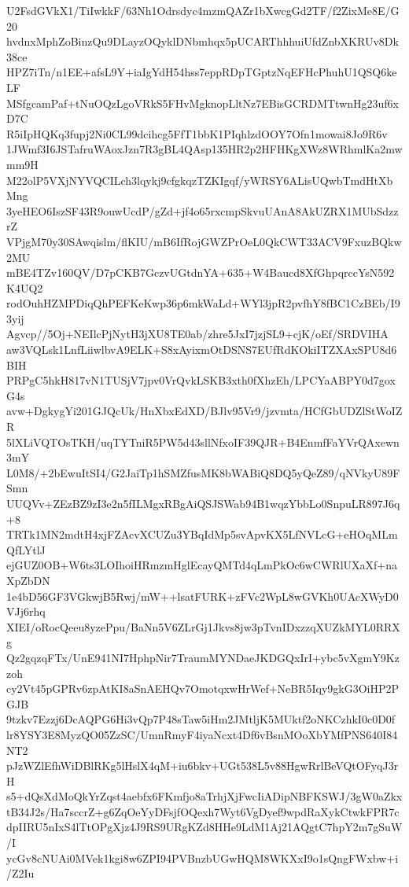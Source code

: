 U2FsdGVkX1/TiIwkkF/63Nh1Odrsdyc4mzmQAZr1bXwcgGd2TF/f2ZixMe8E/G20
hvdnxMphZoBinzQu9DLayzOQyklDNbmhqx5pUCARThhhuiUfdZnbXKRUv8Dk38ce
HPZ7iTn/n1EE+afsL9Y+iaIgYdH54hss7eppRDpTGptzNqEFHcPhuhU1QSQ6keLF
MSfgcamPaf+tNuOQzLgoVRkS5FHvMgknopLltNz7EBisGCRDMTtwnHg23uf6xD7C
R5iIpHQKq3fupj2Ni0CL99dcihcg5FfT1bbK1PIqhlzdOOY7Ofn1mowai8Jo9R6v
1JWmf3I6JSTafruWAoxJzn7R3gBL4QAsp135HR2p2HFHKgXWz8WRhmlKa2mwmm9H
M22olP5VXjNYVQCILch3lqykj9cfgkqzTZKIgqf/yWRSY6ALisUQwbTmdHtXbMng
3yeHEO6IszSF43R9ouwUcdP/gZd+jf4o65rxcmpSkvuUAnA8AkUZRX1MUbSdzzrZ
VPjgM70y30SAwqislm/flKIU/mB6IfRojGWZPrOeL0QkCWT33ACV9FxuzBQkw2MU
mBE4TZv160QV/D7pCKB7GczvUGtdnYA+635+W4Baucd8XfGhpqrccYsN592K4UQ2
rodOuhHZMPDiqQhPEFKeKwp36p6mkWaLd+WYl3jpR2pvfhY8fBC1CzBEb/I93yij
Agvcp//5Oj+NEIlcPjNytH3jXU8TE0ab/zhre5JxI7jzjSL9+cjK/oEf/SRDVIHA
aw3VQLsk1LnfLiiwlbvA9ELK+S8xAyixmOtDSNS7EUfRdKOkiITZXAxSPU8d6BIH
PRPgC5hkH817vN1TUSjV7jpv0VrQvkLSKB3xth0fXhzEh/LPCYaABPY0d7goxG4s
avw+DgkygYi201GJQcUk/HnXbxEdXD/BJlv95Vr9/jzvmta/HCfGbUDZlStWoIZR
5lXLiVQTOsTKH/uqTYTniR5PW5d43sllNfxoIF39QJR+B4EnmfFaYVrQAxewn3mY
L0M8/+2bEwuItSI4/G2JaiTp1hSMZfusMK8bWABiQ8DQ5yQeZ89/qNVkyU89FSmn
UUQVv+ZEzBZ9zI3e2n5fILMgxRBgAiQSJSWab94B1wqzYbbLo0SnpuLR897J6q+8
TRTk1MN2mdtH4xjFZAcvXCUZu3YBqIdMp5svApvKX5LfNVLcG+eHOqMLmQfLYtlJ
ejGUZ0OB+W6ts3LOIhoiHRmzmHglEcayQMTd4qLmPkOc6wCWRlUXaXf+naXpZbDN
1e4bD56GF3VGkwjB5Rwj/mW++lsatFURK+zFVc2WpL8wGVKh0UAcXWyD0VJj6rhq
XIEI/oRocQeeu8yzePpu/BaNn5V6ZLrGj1Jkvs8jw3pTvnIDxzzqXUZkMYL0RRXg
Qz2gqzqFTx/UnE941NI7HphpNir7TraumMYNDaeJKDGQxIrI+ybc5vXgmY9Kzzoh
cy2Vt45pGPRv6zpAtKI8aSnAEHQv7OmotqxwHrWef+NeBR5Iqy9gkG3OiHP2PGJB
9tzkv7Ezzj6DcAQPG6Hi3vQp7P48sTaw5iHm2JMtljK5MUktf2oNKCzhkI0c0D0f
lr8YSY3E8MyzQO05ZzSC/UmnRmyF4iyaNcxt4Df6vBsnMOoXbYMfPNS640I84NT2
pJzWZlEfhWiDBlRKg5lHslX4qM+iu6bkv+UGt538L5v88HgwRrlBeVQtOFyqJ3rH
s5+dQsXdMoQkYrZqst4aebfx6FKmfjo8aTrhjXjFwcIiADipNBFKSWJ/3gW0aZkx
tB34J2s/Ha7sccrZ+g6ZqOeYyDFsjfOQexh7Wyt6VgDyef9wpdRaXykCtwkFPR7c
dpIIRU5nIxS4lTtOPgXjz4J9RS9URgKZd8HHe9LdM1Aj21AQgtC7hpY2m7gSuW/I
ycGv8cNUAi0MVek1kgi8w6ZPI94PVBnzbUGwHQM8WKXxI9o1sQngFWxbw+i/Z2Iu
